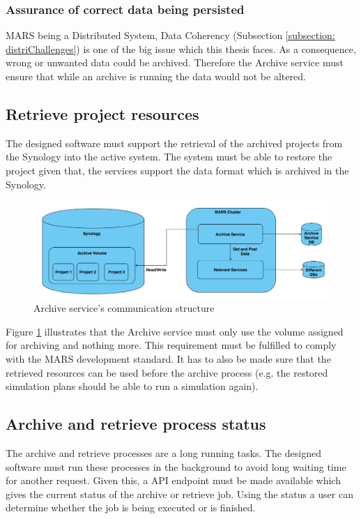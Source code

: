         \subsubsection{Assurance of correct data being persisted}
            MARS being a Distributed System, Data Coherency (Subsection \ref{subsection: distriChallenges}) 
            is one of the big issue which this thesis faces. As a consequence,
            wrong or unwanted data could be archived. Therefore the Archive service must ensure that while an archive is running the data would not be
            altered.
        
        \subsection{Retrieve project resources}    
            The designed software must support the retrieval of the archived projects from the Synology into the active system. The
            system must be able to restore the project given that, the services support the data format which is archived in the Synology.
           
            \begin{figure}[H]
                \centering \includegraphics[scale=0.4]{grafiken/synology.png}
                \caption{Archive service's communication structure}
                \label{fig:synology}
            \end{figure}

            Figure \ref{fig:synology} illustrates that the Archive service must only use the volume assigned for archiving and nothing more. 
            This requirement must be fulfilled to comply with the MARS development standard. It has to also be made sure that the retrieved
            resources can be used before the archive process (e.g. the restored simulation plans should be able to run a simulation again). 

        \subsection{Archive and retrieve process status}  
            The archive and retrieve processes are a long running tasks. The designed software must run these processes in the background to avoid 
            long waiting time for another request. Given this, a API endpoint must be made available which gives the current status of the archive 
            or retrieve job. Using the status a user can determine whether the job is being executed or is finished.


